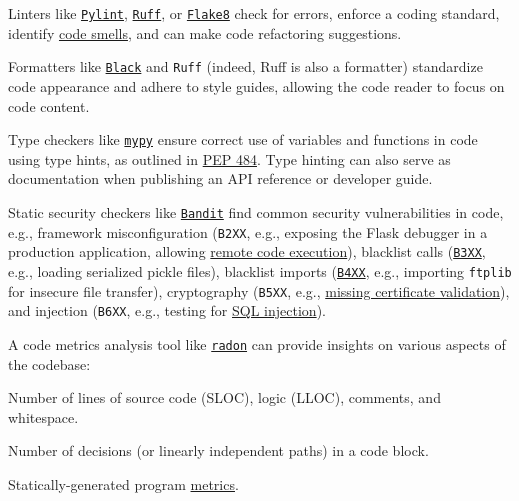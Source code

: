 \documentclass[12pt, titlepage]{article}
\begin{document}
\begin{description}[style=unboxed,leftmargin=0cm]
  \item[Linting] Linters like \href{https://pylint.readthedocs.io/}{\texttt{Pylint}}, \href{https://docs.astral.sh/ruff/}{\texttt{Ruff}}, or \href{https://flake8.pycqa.org/en/stable/}{\texttt{Flake8}} check for errors, enforce a coding standard, identify \href{https://refactoring.guru/refactoring/smells}{code smells}, and can make code refactoring suggestions.
  
  \item[Formatting] Formatters like \href{https://black.readthedocs.io/}{\texttt{Black}} and \texttt{Ruff} (indeed, Ruff is also a formatter) standardize code appearance and adhere to style guides, allowing the code reader to focus on code content.
  
  \item[Type Checking] Type checkers like \href{https://mypy.readthedocs.io/}{\texttt{mypy}} ensure correct use of variables and functions in code using type hints, as outlined in \href{https://peps.python.org/pep-484/}{PEP 484}. Type hinting can also serve as documentation when publishing an API reference or developer guide.
  
  \item[Security Checking] Static security checkers like \href{https://bandit.readthedocs.io/}{\texttt{Bandit}} find common security vulnerabilities in code, e.g., framework misconfiguration (\texttt{B2XX}, e.g., exposing the Flask debugger in a production application, allowing \href{https://flask.palletsprojects.com/en/stable/quickstart/#debug-mode:~:text=Warning}{remote code execution}), blacklist calls (\href{https://bandit.readthedocs.io/en/latest/blacklists/blacklist_calls.html}{\texttt{B3XX}}, e.g., loading serialized pickle files), blacklist imports (\href{https://bandit.readthedocs.io/en/latest/blacklists/blacklist_imports.html}{\texttt{B4XX}}, e.g., importing \texttt{ftplib} for insecure file transfer), cryptography (\texttt{B5XX}, e.g., \href{https://bandit.readthedocs.io/en/latest/plugins/b501_request_with_no_cert_validation.html}{missing certificate validation}), and injection (\texttt{B6XX}, e.g., testing for \href{https://bandit.readthedocs.io/en/latest/plugins/b608_hardcoded_sql_expressions.html}{SQL injection}).
  
  \item[Code Metrics Analysis] A code metrics analysis tool like \href{https://radon.readthedocs.io/en/stable/index.html}{\texttt{radon}} can provide insights on various aspects of the codebase:
    \begin{description}[style=unboxed,labelindent=1cm]
      \item[Raw metrics] Number of lines of source code (SLOC), logic (LLOC), comments, and whitespace.
      \item[Cyclomatic complexity] Number of decisions (or linearly independent paths) in a code block.
      \item[Halstead metrics] Statically-generated program \href{https://radon.readthedocs.io/en/stable/intro.html#halstead-metrics}{metrics}.
    \end{description}
  

\end{description}
\end{document}
